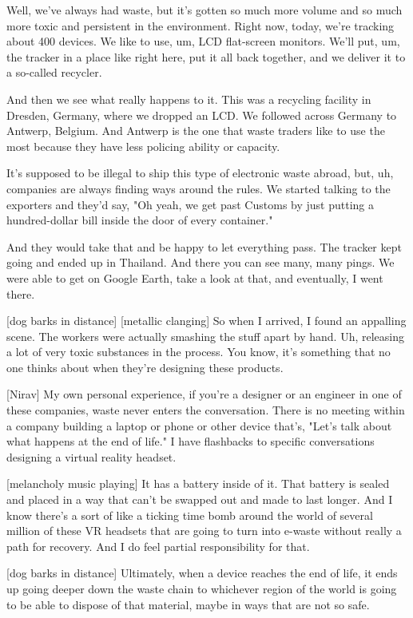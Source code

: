 \documentclass[a4paper]{article}
\begin{document}
	
	Well, we've always had waste, but it's gotten so much more volume and so much more toxic and persistent in the environment.
	Right now, today, we're tracking about 400 devices.
	We like to use, um, LCD flat-screen monitors.
	We'll put, um, the tracker in a place like right here, put it all back together, and we deliver it to a so-called recycler.
	
	
	And then we see what really happens to it.
	This was a recycling facility in Dresden, Germany, where we dropped an LCD.
	We followed across Germany to Antwerp, Belgium.
	And Antwerp is the one that waste traders like to use the most because they have less policing ability or capacity.
	
	
	It's supposed to be illegal to ship this type of electronic waste abroad, but, uh, companies are always finding ways around the rules.
	We started talking to the exporters and they'd say, "Oh yeah, we get past Customs by just putting a hundred-dollar bill inside the door of every container."
	
	
	And they would take that and be happy to let everything pass.
	The tracker kept going and ended up in Thailand.
	And there you can see many, many pings.
	We were able to get on Google Earth, take a look at that, and eventually, I went there.
	
	
	[dog barks in distance]
	[metallic clanging]
	So when I arrived, I found an appalling scene.
	The workers were actually smashing the stuff apart by hand.
	Uh, releasing a lot of very toxic substances in the process.
	You know, it's something that no one thinks about when they're designing these products.
	
	
	[Nirav] My own personal experience, if you're a designer or an engineer in one of these companies, waste never enters the conversation.
	There is no meeting within a company building a laptop or phone or other device that's, "Let's talk about what happens at the end of life."
	I have flashbacks to specific conversations designing a virtual reality headset.
	
	
	
	[melancholy music playing]
	It has a battery inside of it.
	That battery is sealed and placed in a way that can't be swapped out and made to last longer.
	And I know there's a sort of like a ticking time bomb around the world of several million of these VR headsets that are going to turn into e-waste without really a path for recovery.
	And I do feel partial responsibility for that.
	
	
	[dog barks in distance]
	Ultimately, when a device reaches the end of life, it ends up going deeper down the waste chain to whichever region of the world is going to be able to dispose of that material, maybe in ways that are not so safe.
	
\end{document}
